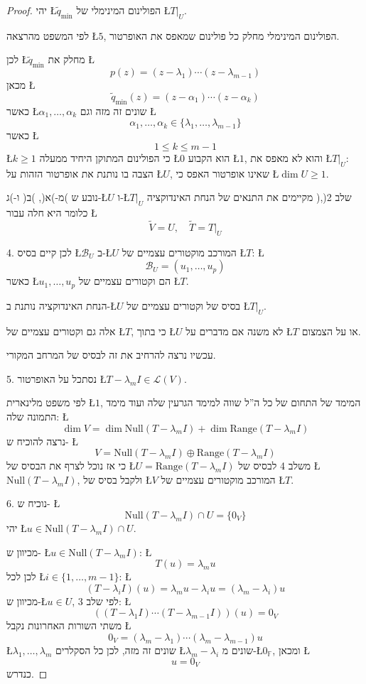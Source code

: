 \documentclass[english,hebrew]{article}
\begin{document}
\begin{proof}
יהי \L{$\widetilde{q}_{\min}$} הפולינום המינימלי של \L{$T|_{U}$}.

לפי המשפט מהרצאה \L{$5$}, הפולינום המינימלי מחלק כל פולינום שמאפס
את האופרטור.

לכן \L{$\widetilde{q}_{\min}$} מחלק את \L{%
\[
p(z)=(z-\lambda_{1})\cdots(z-\lambda_{m-1})
\]
}%
מכאן \L{%
\[
\widetilde{q}_{\min}(z)=(z-\alpha_{1})\cdots(z-\alpha_{k})
\]
}%
כאשר \L{$\alpha_{1},\dots,\alpha_{k}$} שונים זה מזה וגם \L{%
\[
\alpha_{1},\dots,\alpha_{k}\in\{\lambda_{1},\dots,\lambda_{m-1}\}
\]
}%
כאשר \L{%
\[
1\leq k\leq m-1
\]
}%
\L{$k\geq1$} כי הפולינום המתוקן היחיד ממעלה \L{$0$} הוא הקבוע \L{$1$},
והוא לא מאפס את \L{$T|_{U}$}: הצבה בו נותנת את אופרטור הזהות על \L{$U$},
שאינו אופרטור האפס כי \L{$\dim U\geq1$}.

מ-)א(, )ב( ו-)ג( נובע ש-\L{$U$} ו-\L{$T|_{U}$} מקיימים את התנאים
של הנחת האינדוקציה )שלב 2(, כלומר היא חלה עבור \L{%
\[
\widetilde{V}=U,\quad\widetilde{T}=T|_{U}
\]
}%

4. לכן קיים בסיס \L{$\mathcal{B}_{U}$} ב-\L{$U$} המורכב מוקטורים
עצמיים של \L{$T$}: \L{%
\[
\mathcal{B}_{U}=(u_{1},\dots,u_{p})
\]
}%
כאשר \L{$u_{1},\dots,u_{p}$} הם וקטורים עצמיים של \L{$T$}.

הנחת האינדוקציה נותנת ב-\L{$U$} בסיס של וקטורים עצמיים של \L{$T|_{U}$}.

אלה גם וקטורים עצמיים של \L{$T$}, כי בתוך \L{$U$} לא משנה אם מדברים
על \L{$T$} או על הצמצום.

עכשיו נרצה להרחיב את זה לבסיס של המרחב המקורי.

5. נסתכל על האופרטור \L{$T-\lambda_{m}I\in\mathcal{L}(V)$}.

לפי משפט מלינארית \L{$1$}, המימד של התחום של כל ה\textquotedblright ל
שווה למימד הגרעין שלה ועוד מימד התמונה שלה: \L{%
\[
\dim V=\dim\text{Null}(T-\lambda_{m}I)+\dim\text{Range}(T-\lambda_{m}I)
\]
}%
נרצה להוכיח ש- \L{%
\[
V=\text{Null}(T-\lambda_{m}I)\oplus\text{Range}(T-\lambda_{m}I)
\]
}%
כי אז נוכל לצרף את הבסיס של \L{$U=\text{Range}(T-\lambda_{m}I)$}
משלב 4 לבסיס של \L{$\text{Null}(T-\lambda_{m}I)$}, ולקבל בסיס של
\L{$V$} המורכב מוקטורים עצמיים של \L{$T$}.

6. נוכיח ש- \L{%
\[
\text{Null}(T-\lambda_{m}I)\cap U=\{0_{V}\}
\]
}%
יהי \L{$u\in\text{Null}(T-\lambda_{m}I)\cap U$}.

מכיוון ש- \L{$u\in\text{Null}(T-\lambda_{m}I)$}: \L{%
\[
T(u)=\lambda_{m}u
\]
}%
לכן לכל \L{$i\in\{1,\dots,m-1\}$}: \L{%
\[
(T-\lambda_{i}I)(u)=\lambda_{m}u-\lambda_{i}u=(\lambda_{m}-\lambda_{i})u
\]
}%
מכיוון ש-\L{$u\in U$}, לפי שלב 3: \L{%
\[
\left((T-\lambda_{1}I)\cdots(T-\lambda_{m-1}I)\right)(u)=0_{V}
\]
}%
משתי השורות האחרונות נקבל \L{%
\[
0_{V}=(\lambda_{m}-\lambda_{1})\cdots(\lambda_{m}-\lambda_{m-1})u
\]
}%
\L{$\lambda_{1},\dots,\lambda_{m}$} שונים זה מזה, לכן כל הסקלרים
\L{$\lambda_{m}-\lambda_{i}$} שונים מ-\L{$0_{\mathbb{F}}$}, ומכאן
\L{%
\[
u=0_{V}
\]
}%
כנדרש.


\end{proof}
\end{document}
